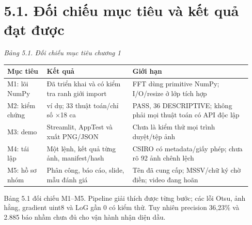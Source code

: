 \documentclass[12pt,a4paper]{extreport}
\begin{document}
\section*{5.1. Đối chiếu mục tiêu và kết quả đạt được}
{\fontsize{10.5}{12}\selectfont\textit{Bảng 5.1. Đối chiếu mục tiêu chương 1}
\begin{longtable}{>{\raggedright\arraybackslash}p{5.035cm}|>{\raggedright\arraybackslash}p{5.035cm}|>{\raggedright\arraybackslash}p{5.035cm}}
\textbf{Mục tiêu} & \textbf{Kết quả} & \textbf{Giới hạn}\\\hline
\endhead
M1: lõi NumPy & Đã triển khai và có kiểm tra ranh giới import & FFT dùng primitive NumPy; I/\allowbreak{}O/\allowbreak{}resize ở lớp tích hợp\\\hline
M2: kiểm chứng & 5 ví dụ; 33 thuật toán/\allowbreak{}chỉ số \ensuremath{\times}18 ca & 558 PASS,\allowbreak{} 36 DESCRIPTIVE; không phải mọi thuật toán có API độc lập\\\hline
M3: demo & Streamlit,\allowbreak{} AppTest và xuất PNG/\allowbreak{}JSON & Chưa là kiểm thử mọi trình duyệt/\allowbreak{}tệp ảnh\\\hline
M4: tái lập & Một lệnh,\allowbreak{} kết quả từng ảnh,\allowbreak{} manifest/\allowbreak{}hash & CSIRO có metadata/\allowbreak{}giấy phép; chưa rõ 92 ảnh chênh lệch\\\hline
M5: hồ sơ nhóm & Phân công,\allowbreak{} báo cáo,\allowbreak{} slide,\allowbreak{} mẫu đánh giá & Tên đã cung cấp; MSSV/\allowbreak{}chữ ký chờ điền; video đang hoãn\\\hline
\end{longtable}}
Bảng 5.1 đối chiếu M1–M5. Pipeline giải thích được từng bước; các lỗi Otsu,\allowbreak{} ảnh hằng,\allowbreak{} gradient uint8 và LoG gần 0 có kiểm thử. Tuy nhiên precision 36,\allowbreak{}23\% và 2.885 báo nhầm chưa đủ cho vận hành nhận diện dầu.
\par
\end{document}
